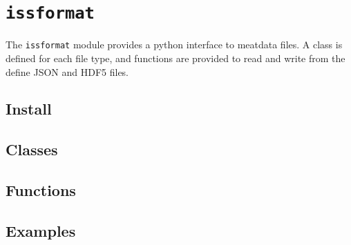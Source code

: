 \documentclass[10pt,a4paper]{article}
\begin{document}
\section{\texttt{issformat}}

The \texttt{issformat} module provides a python interface to meatdata files. A
class is defined for each file type, and functions are provided to read and
write from the define JSON and HDF5 files. 

\subsection{Install}

\subsection{Classes}

\subsection{Functions}

\subsection{Examples}
\end{document}
